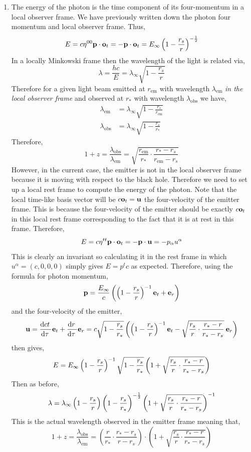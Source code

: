 \documentclass[12pt]{article}
\begin{document}
\begin{enumerate}
\item The energy of the photon is the time component of its four-momentum in a local observer frame. We have previously written down the photon four momentum and local observer frame. Thus,
\[ E = c \eta^{00} \bf{p} \cdot \bf{o}_t = - \bf{p} \cdot \bf{o}_t = E_\infty \sh{r}^{-\frac{1}{2}} \]
In a locally Minkowski frame then the wavelength of the light is related via,
\[ \lambda = \frac{hc}{E} = \lambda_{\infty} \sqrt{1 - \frac{r_s}{r}} \]
Therefore for a given light beam emitted at $r_{\text{em}}$ with wavelength $\lambda_{\text{em}}$ \textit{in the local observer frame} and observed at $r_*$ with wavelength $\lambda_{\text{obs}}$ we have,
\begin{align*}
\lambda_{\text{em}} &= \lambda_{\infty} \sqrt{1 - \frac{r_s}{r_{\text{em}}}}
\\
\lambda_{\text{obs}} &= \lambda_{\infty} \sqrt{1 - \frac{r_s}{r_*}}
\end{align*}
Therefore,
\[ 1 + z = \frac{\lambda_{\text{obs}}}{\lambda_{\text{em}}} = \sqrt{\frac{r_{\text{em}}}{r_*} \cdot \frac{r_* - r_s}{r_{\text{em}} - r_s}} \]
However, in the current case, the emitter is not in the local observer frame because it is moving with respect to the black hole. Therefore we need to set up a local rest frame to compute the energy of the photon. Note that the local time-like basis vector will be $c \bf{o}_t = \bf{u}$ the four-velocity of the emitter frame. This is because the four-velocity of the emitter should be exactly $c \bf{o}_t$ in this local rest frame corresponding to the fact that it is at rest in this frame. Therefore,
\[ E = c \eta^{tt} \bf{p} \cdot \bf{o}_t = - \bf{p} \cdot \bf{u} = - p_\alpha u^\alpha \]
This is clearly an invariant so calculating it in the rest frame in which $u^\alpha = (c,0,0,0)$ simply gives $E = p^t c$ as expected. Therefore, using the formula for photon momentum, 
\[ \bf{p} = \frac{E_\infty}{c} \left( \sh{r}^{-1} \bf{e}_t + \bf{e}_r \right) \]
and the four-velocity of the emitter,
\[ \bf{u} = \deriv{ct}{\tau} \bf{e}_t + \deriv{r}{\tau} \bf{e}_r = c\sqrt{1 - \frac{r_s}{r_*}} \left( \sh{r}^{-1}  \bf{e}_t - \sqrt{\frac{r_s}{r} \cdot \frac{r_* - r}{r_* - r_s}} \: \bf{e}_r \right) \]
then gives,
\[ E = E_{\infty} \sh{r}^{-1} \sqrt{1 - \frac{r_s}{r_*}} \left( 1  + \sqrt{\frac{r_s}{r} \cdot \frac{r_* - r}{r_* - r_s}} \right) \]
Then as before,
\[ \lambda = \lambda_{\infty} \sh{r} \sh{r_*}^{-\frac{1}{2}} \left( 1  + \sqrt{\frac{r_s}{r} \cdot \frac{r_* - r}{r_* - r_s}} \right)^{-1} \]
This is the actual wavelength observed in the emitter frame meaning that,
\[ 1 + z = \frac{\lambda_{\text{obs}}}{\lambda_{\text{em}}} = \left( \frac{r}{r_*} \cdot \frac{r_* - r_s}{r - r_s} \right) \cdot  \left( 1  + \sqrt{\frac{r_s}{r} \cdot \frac{r_* - r}{r_* - r_s}} \right)  \]



\end{enumerate}
\end{document}
